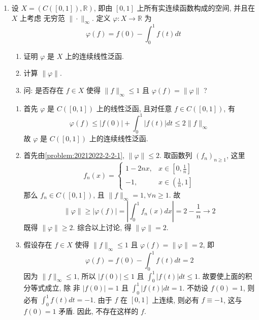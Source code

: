 \begin{enumerate}
    \item 设 $X=(C([0,1]), \mathbb{R})$, 即由 $[0,1]$ 上所有实连续函数构成的空间, 并且在 $X$ 上考虑 无穷范 $\|\cdot\|_{\infty}$. 定义 $\varphi: X \rightarrow \mathbb{R}$ 为
    \[
    \varphi(f)=f(0)-\int_{0}^{1} f(t) d t
    \]
        \begin{enumerate}
            \item 证明 $\varphi$ 是 $X$ 上的连续线性泛函.
            \item 计算 $\|\varphi\|$.
            \item 问: 是否存在 $f \in X$ 使得 $\|f\|_{\infty} \leq 1$ 且 $\varphi(f)=\|\varphi\|$ ?
        \end{enumerate}
        \begin{answer}
            \begin{enumerate}
                \item\label{problem:20212022-2-2-1} 首先 $\varphi$ 是 $C([0,1])$ 上的线性泛函, 且对任意 $f \in C([0,1])$, 有
                \[
                \varphi(f) \leq|f(0)|+\int_{0}^{1}|f(t)| d t \leq 2\|f\|_{\infty}
                \]
                故 $\varphi$ 是 $C([0,1])$ 上的连续线性泛函.
                \item 首先由\ref{problem:20212022-2-2-1}, $\|\varphi\| \leq 2$. 取函数列 $\left(f_{n}\right)_{n \geq 1}$, 这里
                \[
                f_{n}(x)= \begin{cases}1-2 n x, & x \in\left[0, \frac{1}{n}\right] \\ -1, & x \in\left(\frac{1}{n}, 1\right]\end{cases}
                \]
                那么 $f_{n} \in C([0,1])$, 且 $\|f\|_{\infty}=1, \forall n \geq 1$. 故
                \[
                \|\varphi\| \geq|\varphi(f)|=\left|\int_{0}^{1} f_{n}(x) d x\right|=2-\frac{1}{n} \rightarrow 2
                \]
                既得 $\|\varphi\| \geq 2$. 综合以上讨论, 得 $\|\varphi\|=2$.
                \item 假设存在 $f \in X$ 使得 $\|f\|_{\infty} \leq 1$ 且 $\varphi(f)=\|\varphi\|=2$, 即
                \[
                \varphi(f)=f(0)-\int_{0}^{1} f(t) d t=2
                \]
                因为 $\|f\|_{\infty} \leq 1$, 所以 $|f(0)| \leq 1$ 且 $\int_{0}^{1}|f(t)| d t \leq 1$. 故要使上面的积分等式成立, 除 非 $|f(0)|=1$ 且 $\int_{0}^{1}|f(t)| d t=1$. 不妨设 $f(0)=1$, 则必有 $\int_{0}^{1} f(t) d t=-1$. 由于 $f$ 在 $[0,1]$ 上连续, 则必有 $f \equiv-1$, 这与 $f(0)=1$ 矛盾. 因此, 不存在这样的 $f$.
            \end{enumerate}
        \end{answer}

\end{enumerate}
